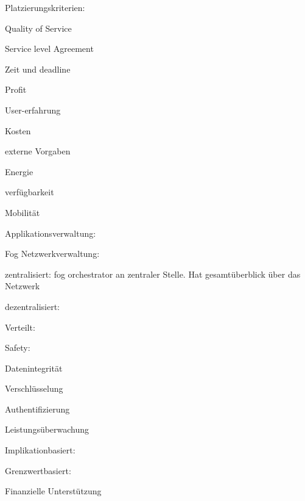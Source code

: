 \begin{notes}
\begin{notes}
\begin{notes}
\begin{notes}
            \end{notes}
            \item Platzierungskriterien:
            \begin{notes}
                \item Quality of Service
                \item Service level Agreement
                \item Zeit und deadline
                \item Profit
                \item User-erfahrung
                \item Kosten
                \item externe Vorgaben
                \item Energie
                \item verfügbarkeit
                \item Mobilität
            \end{notes}
        \end{notes}
        \item Applikationsverwaltung: \cite{Mahmud2020}
        \begin{notes}
            \item Fog Netzwerkverwaltung: \cite{Costa2022}
            \begin{notes}
                \item zentralisiert: fog orchestrator an zentraler Stelle. Hat gesamtüberblick über das Netzwerk
                \item dezentralisiert: 
                \item Verteilt:
            \end{notes}
            \item Safety:
            \begin{notes}
                \item Datenintegrität
                \item Verschlüsselung
                \item Authentifizierung
            \end{notes}
            \item Leistungsüberwachung
            \begin{notes}
                \item Implikationbasiert: 
                \item Grenzwertbasiert:
            \end{notes}
            \item Finanzielle Unterstützung

\end{notes}
\end{notes}
\end{notes}
